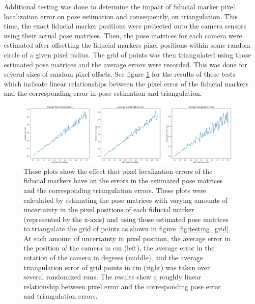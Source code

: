 \documentclass[11pt, letterpaper]{extarticle} %
\begin{document}
Additional testing was done to determine the impact of fiducial marker pixel localization error on pose estimation and consequently, on triangulation. This time, the exact fiducial marker positions were projected onto the camera sensors using their actual pose matrices. Then, the pose matrices for each camera were estimated after offsetting the fiducial markers pixel positions within some random circle of a given pixel radius. The grid of points was then triangulated using those estimated pose matrices and the average errors were recorded. This was done for several sizes of random pixel offsets. See figure \ref{fig:PnP_error_pixel_offset} for the results of these tests which indicate linear relationships between the pixel error of the fiducial markers and the corresponding error in pose estimation and triangulation.

\begin{figure}[h]
    \centering
    \includegraphics[width=\textwidth]{PnP_pixel_offset_errors.png}
    \caption{These plots show the effect that pixel localization errors of the fiducial markers have on the errors in the estimated pose matrices and the corresponding triangulation errors. These plots were calculated by estimating the pose matrices with varying amounts of uncertainty in the pixel positions of each fiducial marker (represented by the x-axis) and using those estimated pose matrices to triangulate the grid of points as shown in figure \ref{fig:testing_grid}. At each amount of uncertainty in pixel position, the average error in the position of the camera in cm (left), the average error in the rotation of the camera in degrees (middle), and the average triangulation error of grid points in cm (right) was taken over several randomized runs. The results show a roughly linear relationship between pixel error and the corresponding pose error and triangulation errors.}
    \label{fig:PnP_error_pixel_offset}
\end{figure}
\end{document}
